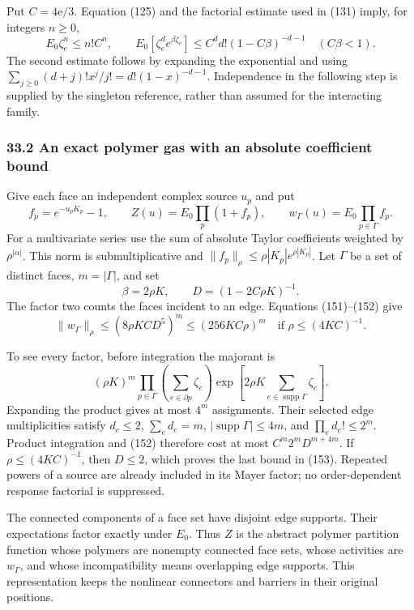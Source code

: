 \documentclass[11pt,a4paper]{article}
\begin{document}
Put \(C=4\mathrm e/3\). Equation (125) and the factorial estimate used
in (131) imply, for integers \(n\ge0\), \[E_0\zeta_e^n\le n!C^n,\qquad
E_0[\zeta_e^d e^{\beta\zeta_e}]
\le C^d d!(1-C\beta)^{-d-1}\quad(C\beta<1).\tag{152}\] The second
estimate follows by expanding the exponential and using
\(\sum_{j\ge0}(d+j)!x^j/j!=d!(1-x)^{-d-1}\). Independence in the
following step is supplied by the singleton reference, rather than
assumed for the interacting family.

\hypertarget{an-exact-polymer-gas-with-an-absolute-coefficient-bound}{%
\subsubsection{33.2 An exact polymer gas with an absolute coefficient
bound}\label{an-exact-polymer-gas-with-an-absolute-coefficient-bound}}

Give each face an independent complex source \(u_p\) and put
\[f_p=e^{-u_pK_p}-1,\qquad
Z(u)=E_0\prod_p(1+f_p),\qquad
w_\Gamma(u)=E_0\prod_{p\in\Gamma}f_p.\] For a multivariate series use
the sum of absolute Taylor coefficients weighted by \(\rho^{|\alpha|}\).
This norm is submultiplicative and
\(\|f_p\|_\rho\le\rho|K_p|e^{\rho|K_p|}\). Let \(\Gamma\) be a set of
distinct faces, \(m=|\Gamma|\), and set
\[\beta=2\rho K,\qquad D=(1-2C\rho K)^{-1}.\] The factor two counts the
faces incident to an edge. Equations (151)--(152) give
\[\|w_\Gamma\|_\rho\le(8\rho KC D^5)^m
\le(256KC\rho)^m\quad\text{if }\rho\le(4KC)^{-1}.
\tag{153}\]

To see every factor, before integration the majorant is
\[ (\rho K)^m\prod_{p\in\Gamma}
 \left(\sum_{e\in\partial p}\zeta_e\right)
 \exp\left[2\rho K\sum_{e\in\operatorname{supp}\Gamma}\zeta_e\right].\]
Expanding the product gives at most \(4^m\) assignments. Their selected
edge multiplicities satisfy \(d_e\le2\), \(\sum_ed_e=m\),
\(|\operatorname{supp}\Gamma|\le4m\), and \(\prod_ed_e!\le2^m\). Product
integration and (152) therefore cost at most \(C^m2^mD^{m+4m}\). If
\(\rho\le(4KC)^{-1}\), then \(D\le2\), which proves the last bound in
(153). Repeated powers of a source are already included in its Mayer
factor; no order-dependent response factorial is suppressed.

The connected components of a face set have disjoint edge supports.
Their expectations factor exactly under \(E_0\). Thus \(Z\) is the
abstract polymer partition function whose polymers are nonempty
connected face sets, whose activities are \(w_\Gamma\), and whose
incompatibility means overlapping edge supports. This representation
keeps the nonlinear connectors and barriers in their original positions.
\end{document}
